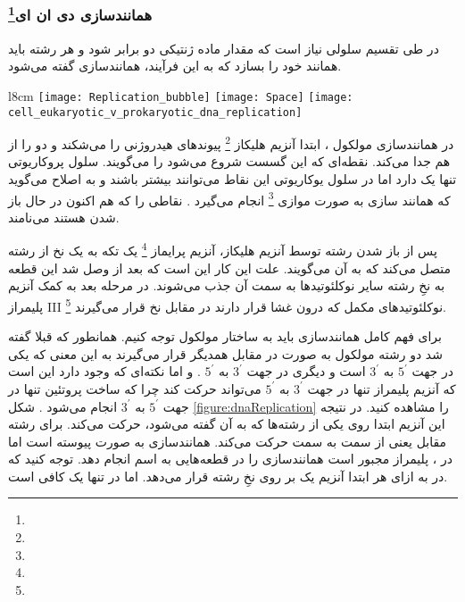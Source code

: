 \subsubsection{همانندسازی دی ان ای\protect\footnote{}}

در طی تقسیم سلولی نیاز است که مقدار ماده ژنتیکی دو برابر شود و هر رشته
باید همانند خود را بسازد که به این فرآیند، همانندسازی
گفته می‌شود.

 \begin{wrapfigure}{l}{8cm}
	\centering
	\texttt{[image: Replication\_bubble]}
	\texttt{[image: Space]}
	\texttt{[image: cell\_eukaryotic\_v\_prokaryotic\_dna\_replication]}
	\vspace{-20pt}
\end{wrapfigure}

در همانندسازی مولکول
، ابتدا آنزیم هلیکاز
 \footnote{}
 پیوند‌های هیدروژنی را می‌شکند و دو
 را از هم جدا می‌کند. نقطه‌ای که این گسست شروع می‌شود را 
 می‌گویند.
 سلول پروکاریوتی تنها یک
  دارد اما در سلول یوکاریوتی این نقاط می‌توانند بیشتر باشند و به اصلاح می‌گوید که همانند سازی به صورت موازی
 \footnote{} 
انجام می‌گیرد 
 .
  نقاطی را که هم اکنون در حال باز شدن هستند
  می‌نامند.
  
پس از باز شدن رشته توسط آنزیم هلیکاز، آنزیم پرایماز
\footnote{}
یک تکه
به یک نخ از رشته
متصل می‌کند که به آن
می‌گویند. علت این کار این است که بعد از وصل شد
این قطعه به نخِ رشته
سایر نوکلئوتید‌ها به سمت آن جذب می‌شوند.
  در مرحله بعد به کمک آنزیم
 پلیمراز
 \RN{3}
 \footnote{}
 نوکلئوتید‌های مکمل که درون غشا قرار دارند در مقابل نخ
 قرار می‌گیرند.
 
 برای فهم کامل همانندسازی باید به ساختار مولکول
 توجه کنیم. همانطور که قبلا گفته شد دو رشته مولکول
 به صورت
 در مقابل همدیگر قرار می‌گیرند به این معنی که یکی در جهت
$ 5^\prime $
  به
$ 3^\prime $
  است و دیگری در جهت
$ 3^\prime $
  به
$ 5^\prime $
.
و اما نکته‌ای که وجود دارد این است که آنزیم
پلیمراز
تنها در جهت
$ 3^\prime $
  به
$ 5^\prime $
می‌تواند حرکت کند چرا که ساخت پروتئین تنها در جهت
$ 5^\prime $
  به
$ 3^\prime $
انجام می‌شود
.
شکل
\ref{figure:dnaReplication}
را مشاهده کنید.
در نتیجه این آنزیم ابتدا روی یکی از رشته‌ها که به آن
گفته می‌شود، حرکت می‌کند. برای رشته مقابل یعنی
از سمت
به سمت
حرکت می‌کند.
همانندسازی
به صورت پیوسته است اما در
،
پلیمراز
مجبور است همانندسازی را در قطعه‌هایی به اسم
انجام دهد. توجه کنید که در
به ازای هر
ابتدا آنزیم
یک
بر روی نخِ رشته قرار می‌دهد.  اما در
تنها یک
کافی است.


